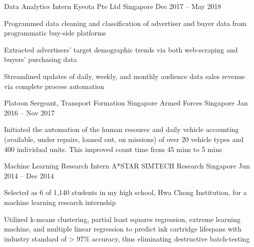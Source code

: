 \begin{cventries}
  \cventry
    {Data Analytics Intern} %
    {Eyeota Pte Ltd } %
    {Singapore} %
    {Dec 2017 – May 2018} %
    {
      \begin{cvitems} %
        \item {Programmed data cleaning and classification of advertiser and buyer data from programmatic buy-side platforms}
        \item {Extracted advertisers’ target demographic trends via both web-scraping and buyers’ purchasing data}
        \item {Streamlined updates of daily, weekly, and monthly audience data sales revenue via complete process automation}
      \end{cvitems}
    }

  \cventry
    {Platoon Sergeant, Transport Formation} %
    {Singapore Armed Forces} %
    {Singapore} %
    {Jan 2016 – Nov 2017} %
    {
      \begin{cvitems} %
        \item {Initiated the automation of the human resource and daily vehicle accounting (available, under repairs, loaned out, on missions) of over 20 vehicle types and 400 individual units. This improved count time from 45 mins to 5 mins }
      \end{cvitems}
    }

  \cventry
    {Machine Learning Research Intern} %
    {A*STAR SIMTECH Research} %
    {Singapore} %
    {Jun 2014 – Dec 2014} %
    {
      \begin{cvitems} %
        \item {Selected as 6 of 1,140 students in my high school, Hwa Chong Institution, for a machine learning research internship}
        \item {Utilized k-means clustering, partial least squares regression, extreme learning machine, and multiple linear regression to predict ink cartridge lifespans with industry standard of > 97\% accuracy, thus eliminating destructive batch-testing}
      \end{cvitems}
    }

\end{cventries}
